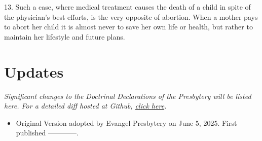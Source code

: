 \documentclass[
]{book}
\providecommand{\tightlist}{%
  \setlength{\itemsep}{0pt}\setlength{\parskip}{0pt}}
\begin{document}
13. Such a case, where medical treatment causes the death of a child in spite of the physician's best efforts, is the very opposite of abortion. When a mother pays to abort her child it is almost never to save her own life or health, but rather to maintain her lifestyle and future plans.

\hypertarget{updates}{%
\chapter*{Updates}\label{updates}}

\emph{Significant changes to the Doctrinal Declarations of the Presbytery will be listed here. For a detailed diff hosted at Github, \href{https://github.com/Evangel-Presbytery/evangel-ddp}{click here}.}

\begin{itemize}
\tightlist
\item
  Original Version adopted by Evangel Presbytery on June 5, 2025. First published ------------.
\end{itemize}
\end{document}
